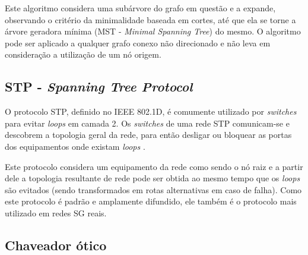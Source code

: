 \documentclass[12pt]{article}
\begin{document}
Este algoritmo considera uma subárvore do grafo em questão e a expande, observando o critério da minimalidade baseada em cortes, até que ela se torne a árvore geradora mínima (MST - \emph{Minimal Spanning Tree}) do mesmo. O algoritmo pode ser aplicado a qualquer grafo conexo não direcionado e não leva em consideração a utilização de um nó origem.

\subsection{STP - \emph{Spanning Tree Protocol}}
\label{subsec:STP}
O protocolo STP, definido no IEEE 802.1D, é comumente utilizado por \emph{switches} para evitar \emph{loops} em camada 2. Os \emph{switches} de uma rede STP comunicam-se e descobrem a topologia geral da rede, para então desligar ou bloquear as portas dos equipamentos onde existam \emph{loops} \cite{Art_Krishnan}.


Este protocolo considera um equipamento da rede como sendo o nó raiz e a partir dele a topologia resultante de rede pode ser obtida ao mesmo tempo que os \emph{loops} são evitados (sendo transformados em rotas alternativas em caso de falha). Como este protocolo é padrão e amplamente difundido, ele também é o protocolo mais utilizado em redes SG reais.

\subsection{Chaveador ótico}

\end{document}

